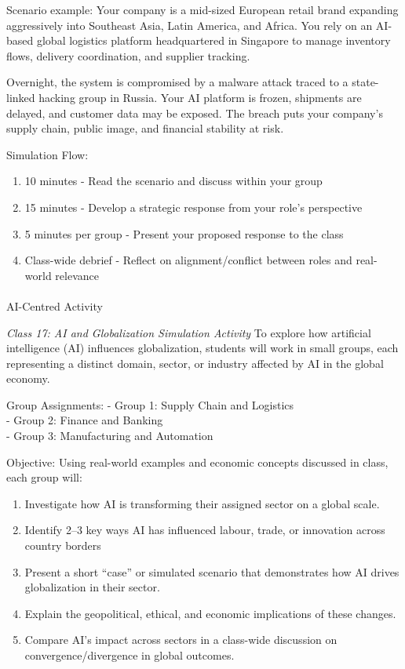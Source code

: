 \documentclass[
  11pt,
]{article}
\makeatletter
\let\oldparagraph\paragraph
\renewcommand{\paragraph}{
    \@ifstar
      \xxxParagraphStar
      \xxxParagraphNoStar
  }
\newcommand{\xxxParagraphStar}[1]{\oldparagraph*{#1}\mbox{}}
\newcommand{\xxxParagraphNoStar}[1]{\oldparagraph{#1}\mbox{}}
\providecommand{\tightlist}{%
  \setlength{\itemsep}{0pt}\setlength{\parskip}{0pt}}
\makeatother
\begin{document}
Scenario example: Your company is a mid-sized European retail brand
expanding aggressively into Southeast Asia, Latin America, and Africa.
You rely on an AI-based global logistics platform headquartered in
Singapore to manage inventory flows, delivery coordination, and supplier
tracking.

Overnight, the system is compromised by a malware attack traced to a
state-linked hacking group in Russia. Your AI platform is frozen,
shipments are delayed, and customer data may be exposed. The breach puts
your company's supply chain, public image, and financial stability at
risk.

Simulation Flow:

\begin{enumerate}
\def\labelenumi{\arabic{enumi}.}
\tightlist
\item
  10 minutes - Read the scenario and discuss within your group
\item
  15 minutes - Develop a strategic response from your role's perspective
\item
  5 minutes per group - Present your proposed response to the class
\item
  Class-wide debrief - Reflect on alignment/conflict between roles and
  real-world relevance
\end{enumerate}

\paragraph{AI-Centred Activity}\label{ai-centred-activity}

\emph{Class 17: AI and Globalization Simulation Activity} To explore how
artificial intelligence (AI) influences globalization, students will
work in small groups, each representing a distinct domain, sector, or
industry affected by AI in the global economy.

Group Assignments: - Group 1: Supply Chain and Logistics\\
- Group 2: Finance and Banking\\
- Group 3: Manufacturing and Automation

Objective: Using real-world examples and economic concepts discussed in
class, each group will:

\begin{enumerate}
\def\labelenumi{\arabic{enumi}.}
\tightlist
\item
  Investigate how AI is transforming their assigned sector on a global
  scale.
\item
  Identify 2--3 key ways AI has influenced labour, trade, or innovation
  across country borders
\item
  Present a short ``case'' or simulated scenario that demonstrates how
  AI drives globalization in their sector.
\item
  Explain the geopolitical, ethical, and economic implications of these
  changes.
\item
  Compare AI's impact across sectors in a class-wide discussion on
  convergence/divergence in global outcomes.
\end{enumerate}
\end{document}
